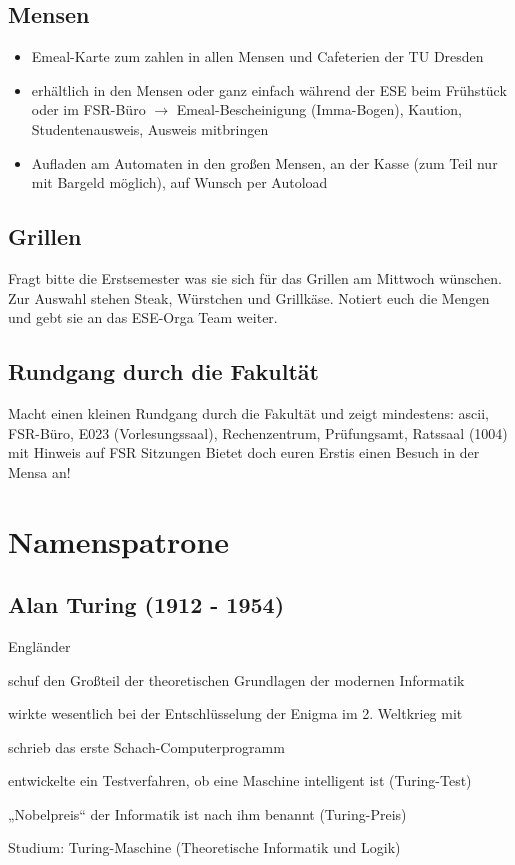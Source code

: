 \documentclass[a4paper,12pt]{report}
\begin{document}
\section{Mensen}
\begin{itemize}
	\item Emeal-Karte zum zahlen in allen Mensen und Cafeterien der TU Dresden
	\item erhältlich in den Mensen oder ganz einfach während der ESE beim Frühstück oder im FSR-Büro
	$\rightarrow$ Emeal-Bescheinigung (Imma-Bogen),  Kaution, Studentenausweis, Ausweis mitbringen
	\item Aufladen am Automaten in den großen Mensen, an der Kasse (zum Teil nur mit Bargeld möglich), auf Wunsch per Autoload
\end{itemize}

\section{Grillen}

Fragt bitte die Erstsemester was sie sich für das Grillen am Mittwoch wünschen. Zur Auswahl stehen Steak, Würstchen und Grillkäse. Notiert euch die Mengen und gebt sie an das ESE-Orga Team weiter.

\section{Rundgang durch die Fakultät}
Macht einen kleinen Rundgang durch die Fakultät und zeigt mindestens: ascii, FSR-Büro, E023 (Vorlesungssaal), Rechenzentrum, Prüfungsamt, Ratssaal (1004) mit Hinweis auf FSR Sitzungen
Bietet doch euren Erstis einen Besuch in der Mensa an!

\chapter{Namenspatrone}
\section*{Alan Turing (1912 - 1954)}
\begin{itemize*}
	\item Engländer
	\item schuf den Großteil der theoretischen Grundlagen der modernen Informatik
	\item wirkte wesentlich bei der Entschlüsselung der Enigma im 2. Weltkrieg mit
	\item schrieb das erste Schach-Computerprogramm
	\item entwickelte ein Testverfahren, ob eine Maschine intelligent ist (Turing-Test)
	\item „Nobelpreis“ der Informatik ist nach ihm benannt (Turing-Preis)
	\item Studium: Turing-Maschine (Theoretische Informatik und Logik)
\end{itemize*}
\end{document}

